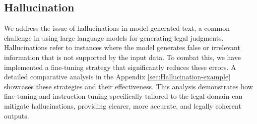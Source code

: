 \subsection{Hallucination}
\label{subsec:hallucination}
We address the issue of hallucinations in model-generated text, a common challenge in using large language models for generating legal judgments. Hallucinations refer to instances where the model generates false or irrelevant information that is not supported by the input data. To combat this, we have implemented a fine-tuning strategy that significantly reduces these errors. A detailed comparative analysis in the Appendix \ref{sec:Hallucination-example} showcases these strategies and their effectiveness. This analysis demonstrates how fine-tuning and instruction-tuning specifically tailored to the legal domain can mitigate hallucinations, providing clearer, more accurate, and legally coherent outputs.


